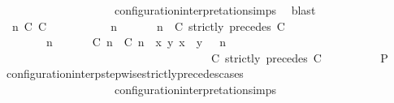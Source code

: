 \begin{isabellebody}
\ \ \ \ \ \ \ \ \ \ \ \ \ \ \ \ \ \ \ \ configuration{\isacharunderscore}interpretation{\isachardot}simps\ \isamarkupfalse%
\ blast\isanewline
\ \ \ \ \isamarkupfalse%
\isanewline
\ \ \ \ \ \ \isamarkupfalse%
\ {\isasymGamma}\ n\ C\ C\ {\isasymPsi}\ {\isasymPhi}\isanewline
\ \ \ \ \ \ \isamarkupfalse%
\ {\isacartoucheopen}{\isacharparenleft}{\isasymGamma}\ n\ {\isasymturnstile}\ {\isasymPsi}\ {\isasymtriangleright}\ {\isasymPhi}\ {\isacharequal}\ {\isacharparenleft}{\isasymGamma}{\isacharcomma}\ n\ {\isasymturnstile}\ {\isacharparenleft}{\isacharparenleft}C\ strictly\ precedes\ C\ {\isacharhash}\ {\isasymPsi}{\isacharparenright}\ {\isasymtriangleright}\ {\isasymPhi}{\isacharparenright}{\isacartoucheclose}\isanewline
\ \ \ \ \ \ \ {\isacartoucheopen}{\isacharparenleft}{\isasymGamma}\ n\ {\isasymturnstile}\ {\isasymPsi}\ {\isasymtriangleright}\ {\isasymPhi}\ {\isacharequal}\ {\isacharparenleft}{\isacharparenleft}{\isacharparenleft}{\isasymlceil}{\isacharhash}\isactrlsup {\isasymle}\ C\ n{\isacharcomma}\ {\isacharhash}\isactrlsup {\isacharless}\ C\ n{\isasymrceil}\ {\isasymin}\ {\isacharparenleft}{\isasymlambda}{\isacharparenleft}x{\isacharcomma}\ y{\isacharparenright}{\isachardot}\ x\ {\isasymle}\ y{\isacharparenright}{\isacharparenright}\ {\isacharhash}\ {\isasymGamma}{\isacharparenright}{\isacharcomma}\ n\isanewline
\ \ \ \ \ \ \ \ \ \ \ \ \ \ \ \ \ \ \ \ \ \ \ \ \ \ \ \ \ \ \ \ \ \ {\isasymturnstile}\ {\isasymPsi}\ {\isasymtriangleright}\ {\isacharparenleft}{\isacharparenleft}C\ strictly\ precedes\ C\ {\isacharhash}\ {\isasymPhi}{\isacharparenright}{\isacharparenright}{\isacartoucheclose}\isanewline
\ \ \ \ \ \ \isamarkupfalse%
\ {\isacharquery}P\ \isamarkupfalse%
\ configuration{\isacharunderscore}interp{\isacharunderscore}stepwise{\isacharunderscore}strictly{\isacharunderscore}precedes{\isacharunderscore}cases\isanewline
\ \ \ \ \ \ \ \ \ \ \ \ \ \ \ \ \ \ \ \ configuration{\isacharunderscore}interpretation{\isachardot}simps\ \isamarkupfalse%

\end{isabellebody}
